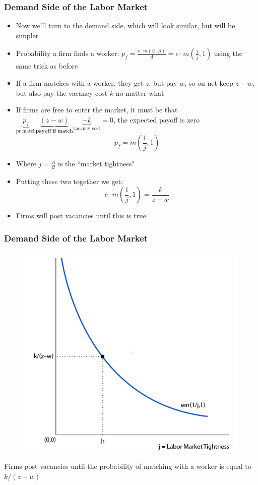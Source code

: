 \documentclass{beamer}
\begin{document}
\begin{frame}
\frametitle[alignment=center]{Demand Side of the Labor Market}
\begin{itemize}
\item Now we'll turn to the demand side, which will look similar, but will be simpler
\item Probability a firm finds a worker: $p_f=\frac{e\cdot m(\mathcal{Q},A)}{A}=e\cdot m(\frac{1}{j},1)$ using the same trick as before
\item If a firm matches with a worker, they get $z$, but pay $w$, so on net keep $z-w$, but also pay the vacancy cost $k$ no matter what
\item If firms are free to enter the market, it must be that $\underbrace{p_f}_{\text{pr match}}\underbrace{(z-w)}_{\textbf{payoff if match}}\underbrace{-k}_{\text{vacancy cost}}=0$, the expected payoff is zero 
$$p_f=m\left(\frac{1}{j},1\right)$$
\item Where $j=\frac{A}{\mathcal{Q}}$ is the ``market tightness"
\item Putting these two together we get:
$$e\cdot m\left(\frac{1}{j},1\right)=\frac{k}{z-w}$$
\item Firms will post vacancies until this is true
\end{itemize}
\end{frame}

 
\begin{frame}
\frametitle[alignment=center]{Demand Side of the Labor Market}
\begin{figure}
\centering
\includegraphics[scale=0.5]{Figures/W_Fig_6pt19.png}
\end{figure}
Firms post vacancies until the probability of matching with a worker is equal to $k/(z-w)$
\end{frame}
\end{document}
